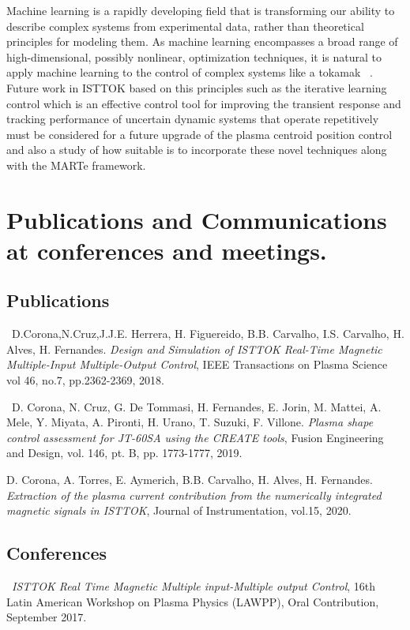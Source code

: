 Machine learning is a rapidly developing field that is transforming our ability to describe complex systems from experimental data, rather than theoretical principles for modeling them. As machine learning encompasses a broad range of high-dimensional, possibly nonlinear, optimization techniques, it is natural to apply machine learning to the control of complex systems like a tokamak ~\cite[Chapter~10]{DataDriven2019}. Future work in ISTTOK based on this principles such as the iterative learning control which is an effective control tool for improving the transient response and tracking performance of uncertain dynamic systems that operate repetitively~\cite{Ahn2007}  must be considered for a future upgrade of the plasma centroid position control and also a study of how suitable is to incorporate these novel techniques along with the MARTe framework.

\section{Publications and Communications at conferences and meetings. }

\subsection{Publications}
\textbullet \, D.Corona,N.Cruz,J.J.E. Herrera, H. Figuereido, B.B. Carvalho, I.S. Carvalho, H. Alves, H. Fernandes. \textit{Design and Simulation of ISTTOK Real-Time Magnetic Multiple-Input Multiple-Output Control}, IEEE Transactions on Plasma Science vol 46, no.7, pp.2362-2369, 2018.
\smallskip

\textbullet \, D. Corona, N. Cruz, G. De Tommasi, H. Fernandes, E. Jorin, M. Mattei, A. Mele, Y. Miyata, A. Pironti, H. Urano, T. Suzuki, F. Villone.\textit{ Plasma shape control assessment for JT-60SA using the CREATE tools}, Fusion Engineering and Design, vol. 146, pt. B, pp. 1773-1777, 2019.
\smallskip

\textbullet D. Corona, A. Torres, E. Aymerich, B.B. Carvalho, H. Alves, H. Fernandes. \textit{Extraction of the plasma current contribution from the numerically integrated magnetic signals in ISTTOK}, Journal of Instrumentation, vol.15, 2020.
\smallskip

\subsection{Conferences}

\textbullet \, \textit{ISTTOK Real Time Magnetic Multiple input-Multiple output Control}, 16th Latin American Workshop on Plasma Physics (LAWPP), Oral Contribution, September 2017.
\smallskip

